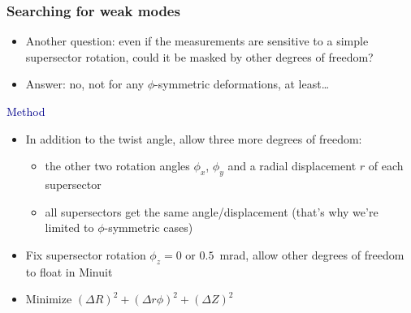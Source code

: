 \documentclass[compress]{beamer}
\begin{document}
\begin{frame}
\frametitle{Searching for weak modes}
\begin{itemize}
\item Another question: even if the measurements are sensitive to a
  simple supersector rotation, could it be masked by other degrees of freedom?
\item Answer: no, not for any $\phi$-symmetric deformations, at least\ldots
\end{itemize}

\vfill
\textcolor{darkblue}{\Large Method}
\begin{itemize}
\item In addition to the twist angle, allow three more degrees of
  freedom:
\begin{itemize}
\item the other two rotation angles $\phi_x$, $\phi_y$ and a radial displacement $r$ of each supersector
\item all supersectors get the same angle/displacement (that's why we're limited to $\phi$-symmetric cases)
\end{itemize}
\item Fix supersector rotation $\phi_z = 0$ or $0.5$~mrad, allow other degrees of freedom to float in Minuit
\item Minimize $(\Delta R)^2 + (\Delta r\phi)^2 + (\Delta Z)^2$
\end{itemize}
\end{frame}
\end{document}
